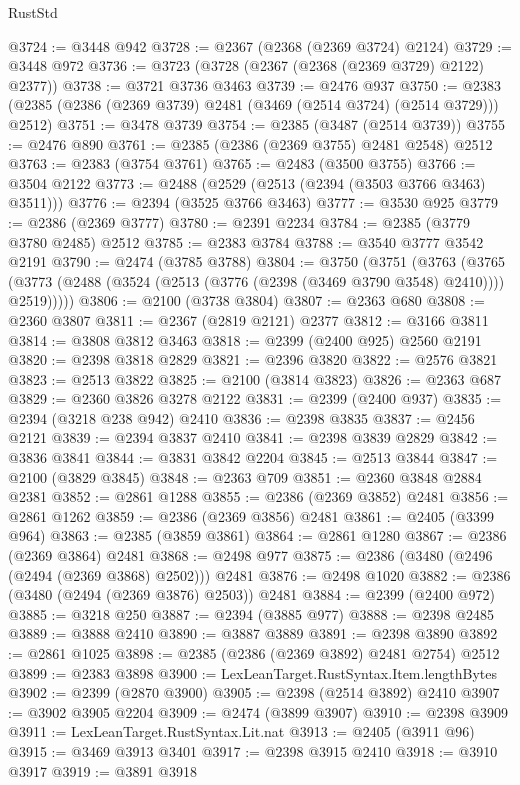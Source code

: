 \begin{lexlean}{RustStd}
\begin{coremodule}
@3724 := @3448 @942
@3728 := @2367 (@2368 (@2369 @3724) @2124)
@3729 := @3448 @972
@3736 := @3723 (@3728 (@2367 (@2368 (@2369 @3729) @2122) @2377))
@3738 := @3721 @3736 @3463
@3739 := @2476 @937
@3750 := @2383 (@2385 (@2386 (@2369 @3739) @2481 (@3469 (@2514 @3724) (@2514 @3729))) @2512)
@3751 := @3478 @3739
@3754 := @2385 (@3487 (@2514 @3739))
@3755 := @2476 @890
@3761 := @2385 (@2386 (@2369 @3755) @2481 @2548) @2512
@3763 := @2383 (@3754 @3761)
@3765 := @2483 (@3500 @3755)
@3766 := @3504 @2122
@3773 := @2488 (@2529 (@2513 (@2394 (@3503 @3766 @3463) @3511)))
@3776 := @2394 (@3525 @3766 @3463)
@3777 := @3530 @925
@3779 := @2386 (@2369 @3777)
@3780 := @2391 @2234
@3784 := @2385 (@3779 @3780 @2485) @2512
@3785 := @2383 @3784
@3788 := @3540 @3777 @3542 @2191
@3790 := @2474 (@3785 @3788)
@3804 := @3750
    (@3751
      (@3763
        (@3765 (@3773 (@2488 (@3524 (@2513 (@3776 (@2398 (@3469 @3790 @3548) @2410)))) @2519)))))
@3806 := @2100 (@3738 @3804)
@3807 := @2363 @680
@3808 := @2360 @3807
@3811 := @2367 (@2819 @2121) @2377
@3812 := @3166 @3811
@3814 := @3808 @3812 @3463
@3818 := @2399 (@2400 @925) @2560 @2191
@3820 := @2398 @3818 @2829
@3821 := @2396 @3820
@3822 := @2576 @3821
@3823 := @2513 @3822
@3825 := @2100 (@3814 @3823)
@3826 := @2363 @687
@3829 := @2360 @3826 @3278 @2122
@3831 := @2399 (@2400 @937)
@3835 := @2394 (@3218 @238 @942) @2410
@3836 := @2398 @3835
@3837 := @2456 @2121
@3839 := @2394 @3837 @2410
@3841 := @2398 @3839 @2829
@3842 := @3836 @3841
@3844 := @3831 @3842 @2204
@3845 := @2513 @3844
@3847 := @2100 (@3829 @3845)
@3848 := @2363 @709
@3851 := @2360 @3848 @2884 @2381
@3852 := @2861 @1288
@3855 := @2386 (@2369 @3852) @2481
@3856 := @2861 @1262
@3859 := @2386 (@2369 @3856) @2481
@3861 := @2405 (@3399 @964)
@3863 := @2385 (@3859 @3861)
@3864 := @2861 @1280
@3867 := @2386 (@2369 @3864) @2481
@3868 := @2498 @977
@3875 := @2386 (@3480 (@2496 (@2494 (@2369 @3868) @2502))) @2481
@3876 := @2498 @1020
@3882 := @2386 (@3480 (@2494 (@2369 @3876) @2503)) @2481
@3884 := @2399 (@2400 @972)
@3885 := @3218 @250
@3887 := @2394 (@3885 @977)
@3888 := @2398 @2485
@3889 := @3888 @2410
@3890 := @3887 @3889
@3891 := @2398 @3890
@3892 := @2861 @1025
@3898 := @2385 (@2386 (@2369 @3892) @2481 @2754) @2512
@3899 := @2383 @3898
@3900 := LexLeanTarget.RustSyntax.Item.lengthBytes
@3902 := @2399 (@2870 @3900)
@3905 := @2398 (@2514 @3892) @2410
@3907 := @3902 @3905 @2204
@3909 := @2474 (@3899 @3907)
@3910 := @2398 @3909
@3911 := LexLeanTarget.RustSyntax.Lit.nat
@3913 := @2405 (@3911 @96)
@3915 := @3469 @3913 @3401
@3917 := @2398 @3915 @2410
@3918 := @3910 @3917
@3919 := @3891 @3918

\end{coremodule}
\end{lexlean}
